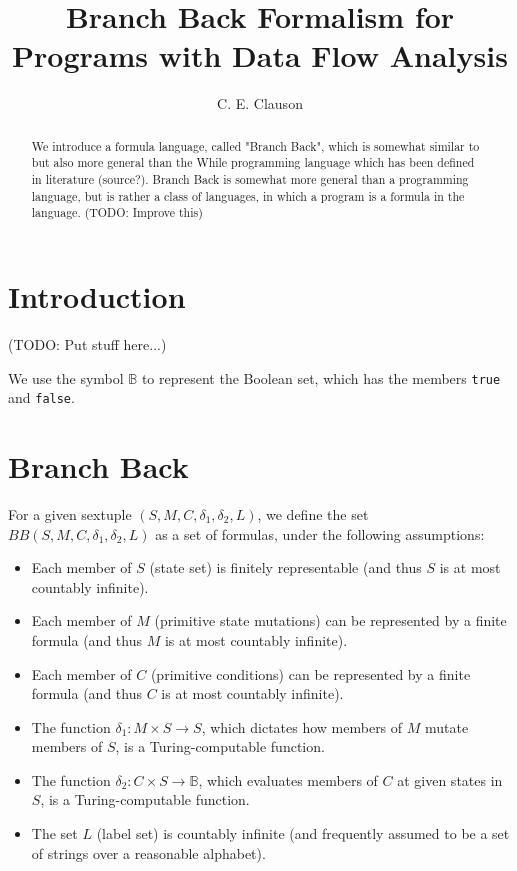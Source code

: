 \documentclass[11pt]{article}
\begin{document}
\title{Branch Back Formalism for Programs with Data Flow Analysis}
\author{C. E. Clauson}
\maketitle

\begin{abstract}
We introduce a formula language, called "Branch Back", which is somewhat similar to but also more general than the While programming language which has been defined in literature (source?).  Branch Back is somewhat more general than a programming language, but is rather a class of languages, in which a program is a formula in the language. (TODO: Improve this)
\end{abstract}

\section{Introduction}
(TODO: Put stuff here...)

We use the symbol $\mathbb{B}$ to represent the Boolean set, which has the members \texttt{true} and \texttt{false}.

\section{Branch Back}
For a given sextuple $(S, M, C, \delta_{1}, \delta_{2}, L)$, we define the set $BB(S, M, C, \delta_{1}, \delta_{2}, L)$ as a set of formulas, under the following assumptions:

\begin{itemize}
\item Each member of $S$ (state set) is finitely representable (and thus $S$ is at most countably infinite).
\item Each member of $M$ (primitive state mutations) can be represented by a finite formula (and thus $M$ is at most countably infinite).
\item Each member of $C$ (primitive conditions) can be represented by a finite formula (and thus $C$ is at most countably infinite).
\item The function $\delta_{1} : M \times S \rightarrow S$, which dictates how members of $M$ mutate members of $S$, is a Turing-computable function. 
\item The function $\delta_{2} : C \times S \rightarrow \mathbb{B}$, which evaluates members of $C$ at given states in $S$, is a Turing-computable function.
\item The set $L$ (label set) is countably infinite (and frequently assumed to be a set of strings over a reasonable alphabet).
\end{itemize}
\end{document}
